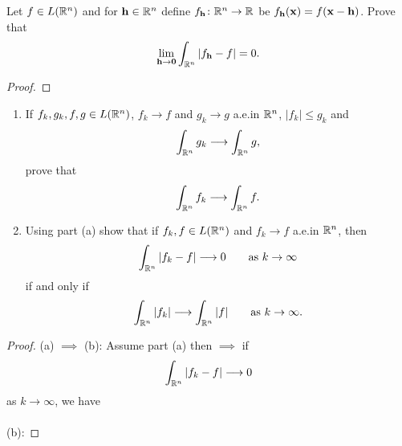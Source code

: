 \begin{problem}
Let $f\in L(\mathbb{R}^n)$ and for $\mathbf{h}\in\mathbb{R}^n$ define
$f_{\mathbf{h}}\colon\mathbb{R}^n\to\mathbb{R}$ be $f_{\mathbf{h}}(\mathbf{x})=
f(\mathbf{x}-\mathbf{h})$. Prove that
\[
\lim_{\mathbf{h}\to\mathbf{0}}\int_{\mathbb{R}^n}\left|f_{\mathbf{h}}-f\right|=0.
\]
\end{problem}
\begin{proof}
\end{proof}

\begin{problem}
\begin{enumerate}[label=(\alph*),noitemsep]
\item If $f_k,g_k,f,g\in L(\mathbb{R}^n)$, $f_k\to f$ and $g_k\to g$ a.e.\@ in
  $\mathbb{R}^n$, $|f_k|\leq g_k$ and
\[
\int_{\mathbb{R}^n}g_k\longrightarrow\int_{\mathbb{R}^n}g,
\]
prove that
\[
\int_{\mathbb{R}^n} f_k\longrightarrow\int_{\mathbb{R}^n}f.
\]
\item Using part (a) show that if $f_k,f\in L(\mathbb{R}^n)$ and $f_k\to f$
  a.e.\@ in $\mathbb{R}^n$, then
\[
\int_{\mathbb{R}^n}|f_k-f|\longrightarrow 0\qquad\text{as $k\to\infty$}
\]
if and only if
\[
\int_{\mathbb{R}^n}|f_k|\longrightarrow\int_{\mathbb{R}^n}|f|\qquad\text{as $k\to\infty$}.
\]
\end{enumerate}
\end{problem}
\begin{proof}
(a) $\implies$ (b): Assume part (a) then $\implies$ if
\begin{equation}
\label{eq:prep:2:12}
\int_{\mathbb{R}^n}|f_k-f|\longrightarrow 0
\end{equation}
as $k\to\infty$, we have
\\\\
(b):
\end{proof}

